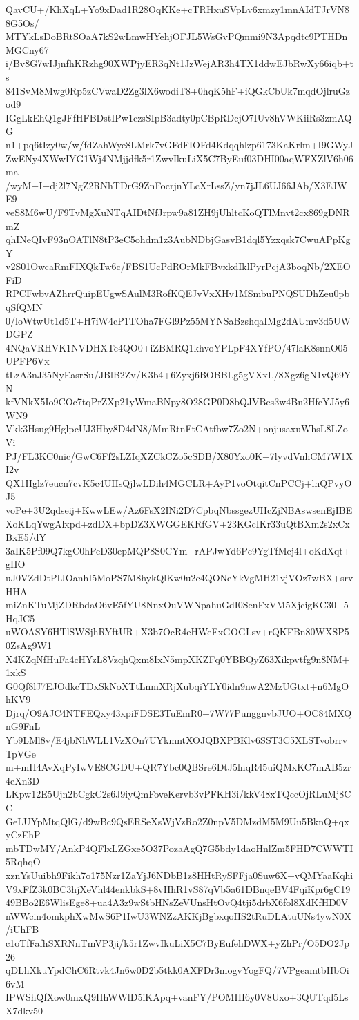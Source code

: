QavCU+/KhXqL+Yo9xDad1R28OqKKe+cTRHxuSVpLv6xmzy1mnAIdTJrVN88G5Os/
MTYkLsDoBRtSOaA7kS2wLmwHYehjOFJL5WsGvPQmmi9N3Apqdtc9PTHDnMGCny67
i/Bv8G7wIJjnfhKRzhg90XWPjyER3qNt1JzWejAR3h4TX1ddwEJbRwXy66iqb+ts
841SvM8Mwg0Rp5zCVwaD2Zg3lX6wodiT8+0hqK5hF+iQGkCbUk7mqdOjlruGzod9
IGgLkEhQ1gJFfHFBDstIPw1czsSIpB3adty0pCBpRDcjO7IUv8hVWKiiRs3zmAQG
n1+pq6tIzy0w/w/fdZahWye8LMrk7vGFdFIOFd4Kdqqhlzp6173KaKrlm+I9GWyJ
ZwENy4XWwIYG1Wj4NMjjdfk5r1ZwvIkuLiX5C7ByEuf03DHI00aqWFXZlV6h06ma
/wyM+I+dj2l7NgZ2RNhTDrG9ZnFocrjnYLcXrLssZ/yn7jJL6UJ66JAb/X3EJWE9
veS8M6wU/F9TvMgXuNTqAIDtNfJrpw9a81ZH9jUhltcKoQTlMnvt2cx869gDNRmZ
qhINeQIvF93nOATlN8tP3eC5ohdm1z3AubNDbjGasvB1dql5Yzxqsk7CwuAPpKgY
v2S01OwcaRmFIXQkTw6c/FBS1UcPdROrMkFBvxkdIklPyrPcjA3boqNb/2XEOFiD
RPCFwbvAZhrrQuipEUgwSAulM3RofKQEJvVxXHv1MSmbuPNQSUDhZeu0pbqSfQMN
0/loWtwUt1d5T+H7iW4cP1TOha7FGl9Pz55MYNSaBzshqaIMg2dAUmv3d5UWDGPZ
4NQaVRHVK1NVDHXTc4QO0+iZBMRQ1khvoYPLpF4XYfPO/47laK8snnO05UPFP6Vx
tLzA3nJ35NyEasrSu/JBlB2Zv/K3b4+6Zyxj6BOBBLg5gVXxL/8Xgz6gN1vQ69YN
kfVNkX5Io9COc7tqPrZXp21yWmaBNpy8O28GP0D8bQJVBes3w4Bn2HfeYJ5y6WN9
Vkk3Hsug9HglpcUJ3Hby8D4dN8/MmRtnFtCAtfbw7Zo2N+onjusaxuWhsL8LZoVi
PJ/FL3KC0nic/GwC6Ff2sLZIqXZCkCZo5cSDB/X80Yxo0K+7lyvdVnhCM7W1XI2v
QX1Hglz7eucn7cvK5c4UHsQjlwLDih4MGCLR+AyP1voOtqitCnPCCj+lnQPvyOJ5
voPe+3U2qdseij+KwwLEw/Az6FsX2INi2D7CpbqNbssgezUHcZjNBAswsenEjIBE
XoKLqYwgAlxpd+zdDX+bpDZ3XWGGEKRfGV+23KGcIKr33uQtBXm2s2xCxBxE5/dY
3aIK5Pf09Q7kgC0hPeD30epMQP8S0CYm+rAPJwYd6Pc9YgTfMej4l+oKdXqt+gHO
uJ0VZdDtPIJOanhI5MoPS7M8hykQlKw0u2c4QONeYkVgMH21vjVOz7wBX+srvHHA
miZnKTuMjZDRbdaO6vE5fYU8NnxOuVWNpahuGdI0SenFxVM5XjcigKC30+5HqJC5
uWOASY6HTlSWSjhRYftUR+X3b7OcR4eHWeFxGOGLsv+rQKFBn80WXSP50ZsAg9W1
X4KZqNfHuFa4cHYzL8VzqhQxm8IxN5mpXKZFq0YBBQyZ63Xikpvtfg9n8NM+1xkS
G0Qf8lJ7EJOdkcTDxSkNoXTtLnmXRjXubqiYLY0idn9nwA2MzUGtxt+n6MgOhKV9
Djrq/O9AJC4NTFEQxy43xpiFDSE3TuEmR0+7W77PunggnvbJUO+OC84MXQnG9FnL
Yb9LMl8v/E4jbNhWLL1VzXOn7UYkmntXOJQBXPBKlv6SST3C5XLSTvobrrvTpVGe
m+mH4AvXqPyIwVE8CGDU+QR7Ybc0QBSre6DtJ5lnqR45uiQMxKC7mAB5zr4eXn3D
LKpw12E5Ujn2bCgkC2s6J9iyQmFoveKervb3vPFKH3i/kkV48xTQccOjRLuMj8CC
GeLUYpMtqQlG/d9wBc9QsERSeXsWjVzRo2Z0npV5DMzdM5M9Uu5BknQ+qxyCzEhP
mbTDwMY/AnkP4QFlxLZGxe5O37PozaAgQ7G5bdy1daoHnlZm5FHD7CWWTI5RqhqO
xznYsUuibh9Fikh7o175Nzr1ZaYjJ6NDbB1z8HHtRySFFja0Suw6X+vQMYaaKqhi
V9xFfZ3k0BC3hjXeVhl44enkbkS+8vHhR1vS87qVb5a61DBnqeBV4FqiKpr6gC19
49BBo2E6WlisEge8+ua4A3z9wStbHNsZeVUnsHtOvQ4tji5drbX6fol8XdKfHD0V
nWWcin4omkphXwMwS6P1IwU3WNZzAKKjBgbxqoHS2tRuDLAtuUNs4ywN0X/iUhFB
c1oTfFafhSXRNnTmVP3ji/k5r1ZwvIkuLiX5C7ByEufehDWX+yZhPr/O5DO2Jp26
qDLhXkuYpdChC6Rtvk4Jn6w0D2b5tkk0AXFDr3mogvYogFQ/7VPgeamtbHbOi6vM
IPWShQfXow0mxQ9HhWWlD5iKApq+vanFY/POMHI6y0V8Uxo+3QUTqd5LsX7dkv50
